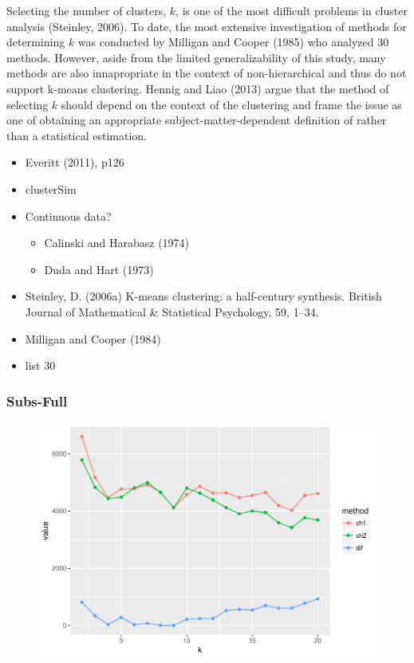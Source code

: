\documentclass[floatsintext,man]{apa6}
\providecommand{\tightlist}{%
  \setlength{\itemsep}{0pt}\setlength{\parskip}{0pt}}
\theoremstyle{definition}
\theoremstyle{definition}
\theoremstyle{definition}
\theoremstyle{remark}
\begin{document}
Selecting the number of clusters, \(k\), is one of the most difficult
problems in cluster analysis (Steinley, 2006). To date, the most
extensive investigation of methods for determining \(k\) was conducted
by Milligan and Cooper (1985) who analyzed 30 methods. However, aside
from the limited generalizability of this study, many methods are also
innapropriate in the context of non-hierarchical and thus do not support
k-means clustering. Hennig and Liao (2013) argue that the method of
selecting \(k\) should depend on the context of the clustering and frame
the issue as one of obtaining an appropriate subject-matter-dependent
definition of rather than a statistical estimation.

\begin{itemize}
\item
  Everitt (2011), p126
\item
  clusterSim
\item
  Continuous data?

  \begin{itemize}
  \tightlist
  \item
    Calinski and Harabasz (1974)
  \item
    Duda and Hart (1973)
  \end{itemize}
\item
  Steinley, D. (2006a) K-means clustering: a half-century synthesis.
  British Journal of Mathematical \& Statistical Psychology, 59, 1--34.
\item
  Milligan and Cooper (1984)
\item
  list 30
\end{itemize}

\subsubsection{Subs-Full}\label{subs-full}

\begin{figure}
\centering
\includegraphics{Method_files/figure-latex/SUBS_FULL_CH-1.pdf}
\caption{}
\end{figure}
\end{document}
